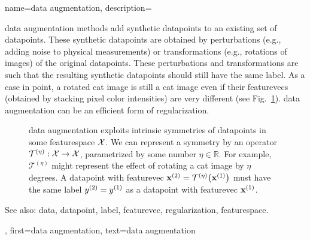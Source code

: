 {name={data augmentation},
	description={\Gls{data} augmentation methods add synthetic \glspl{datapoint} 
		to an existing set of \glspl{datapoint}. These synthetic \glspl{datapoint} are obtained by 
		perturbations (e.g., adding noise to physical measurements) or transformations 
		(e.g., rotations of images) of the original \glspl{datapoint}. These perturbations and 
		transformations are such that the resulting synthetic \glspl{datapoint} should 
		still have the same \gls{label}. As a case in point, a rotated cat image is still 
		a cat image even if their \glspl{featurevec} (obtained by stacking pixel color intensities) 
		are very different (see Fig.\ \ref{fig_symmetry_dataaug_dict}). \Gls{data} augmentation can be an 
		efficient form of \gls{regularization}.
		\begin{figure}[H]
		\begin{center}
			  \vspace*{-11mm}
		\end{center}
		\caption{\Gls{data} augmentation exploits intrinsic symmetries of \glspl{datapoint} in 
		       some \gls{featurespace} $\mathcal{X}$. We can represent a symmetry by 
		     an operator $\mathcal{T}^{(\eta)}: \mathcal{X} \rightarrow \mathcal{X}$,
		     parametrized by some number $\eta \in \mathbb{R}$. For example, $\mathcal{T}^{(\eta)}$ 
		    might represent the effect of rotating a cat image by $\eta$ degrees. A \gls{datapoint} 
		    with \gls{featurevec} ${\bf x}^{(2)} = \mathcal{T}^{(\eta)} \big({\bf x}^{(1)} \big)$ must 
		    have the same \gls{label} $y^{(2)}=y^{(1)}$ as a \gls{datapoint} 
		     with \gls{featurevec} ${\bf x}^{(1)}$.\label{fig_symmetry_dataaug_dict}}
		 \end{figure}
		See also: \gls{data}, \gls{datapoint}, \gls{label}, \gls{featurevec}, \gls{regularization}, \gls{featurespace}. },
	first={data augmentation},
	text={data augmentation}
}
	
